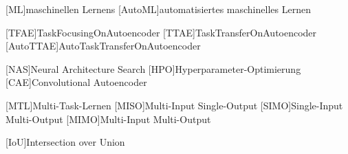 \begin{acronym}[IEEE]
	[ML]{maschinellen Lernens}
	[AutoML]{automatisiertes maschinelles Lernen}
	
	[TFAE]{TaskFocusingOnAutoencoder}
	[TTAE]{TaskTransferOnAutoencoder}
	[AutoTTAE]{AutoTaskTransferOnAutoencoder}
	
	[NAS]{Neural Architecture Search}
	[HPO]{Hyperparameter-Optimierung}	
	[CAE]{Convolutional Autoencoder}	
	
	
	[MTL]{Multi-Task-Lernen}		
	[MISO]{Multi-Input Single-Output}	
	[SIMO]{Single-Input Multi-Output}	
	[MIMO]{Multi-Input Multi-Output}	
	
	[IoU]{Intersection over Union}	
\end{acronym}
